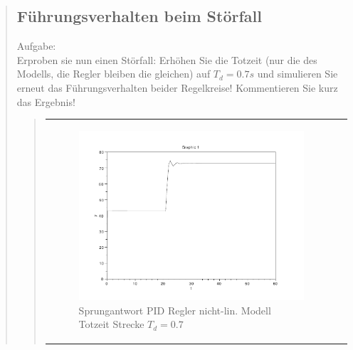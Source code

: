 \begin{quote}
\begin{quote}
    \end{quote}
    
    
    \subsection{Führungsverhalten beim Störfall}
    Aufgabe:\\
    Erproben sie nun einen Störfall: Erhöhen Sie die Totzeit (nur die des Modells, die Regler bleiben die gleichen)
    auf $T_d = 0.7s$ und simulieren Sie erneut das Führungsverhalten beider Regelkreise! Kommentieren Sie kurz das
    Ergebnis!\vspace{1em}
    
    \begin{quote}
    
        \begin{center}
            \begin{tabular}{ll}
            
            \hspace{-2.5cm}
                \begin{minipage}{0.6\textwidth}
                    \begin{figure}[H]
                        \includegraphics[scale=0.4, trim = 0cm 0cm 0cm
                        0cm, clip]
                        {./Bilder/4_5_Td_04_K_tilde}
                          \caption{Sprungantwort PID Regler nicht-lin. Modell Totzeit Strecke $T_d = 0.7$}
                    \end{figure}
                \end{minipage}
                

\end{tabular}
\end{center}
\end{quote}
\end{quote}
